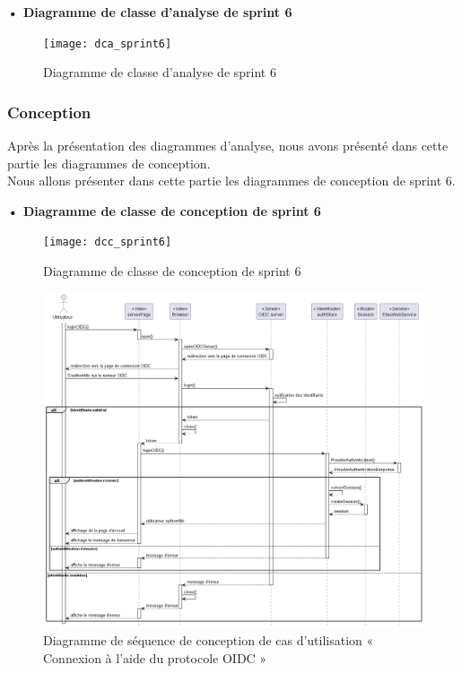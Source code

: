 \setlength{\parskip}{1em}
\setlength{\parindent}{0em}

\textbf{•	Diagramme de classe d'analyse de sprint 6 }


\begin{figure}[H]
  \centering
  \texttt{[image: dca\_sprint6]}
  \caption{Diagramme de classe d'analyse de sprint 6}
  \label{fig:class_analyse_sprint6}
\end{figure}


\subsubsection{Conception}

Après la présentation des diagrammes d'analyse, nous avons présenté dans cette partie les diagrammes de conception.\\ 
Nous allons présenter dans cette partie les diagrammes de conception de sprint 6. 
\begin{landscape}

\textbf{•	Diagramme de classe de conception de sprint 6}

\begin{figure}[H]
  \centering
  \texttt{[image: dcc\_sprint6]}
  \caption{Diagramme de classe de conception de sprint 6}
  \label{fig:class_diagram_61}
\end{figure}
\end{landscape}


\begin{figure}[H]
  \centering
  \includegraphics[width=1\textwidth]{out/diagrams/sprint5/sequence_OIDC/sequence_OIDC}
  \caption{Diagramme de séquence de conception de cas d'utilisation « Connexion à l'aide du protocole OIDC »}
  \label{fig:sequence_conception_auth_OIDC}
\end{figure}

